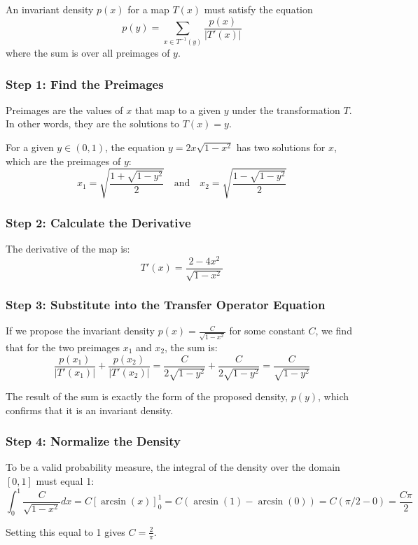 \documentclass[12pt,a4paper]{article}
\begin{document}
An invariant density $p(x)$ for a map $T(x)$ must satisfy the equation 
\[
p(y) = \sum_{x \in T^{-1}(y)} \frac{p(x)}{|T'(x)|}
\]
where the sum is over all preimages of $y$.

\subsubsection{Step 1: Find the Preimages}

Preimages are the values of $x$ that map to a given $y$ under the transformation $T$. In other words, they are the solutions to $T(x) = y$.

For a given $y \in (0, 1)$, the equation $y = 2x\sqrt{1-x^2}$ has two solutions for $x$, which are the preimages of $y$:
\[
x_1 = \sqrt{\frac{1+\sqrt{1-y^2}}{2}} \quad \text{and} \quad x_2 = \sqrt{\frac{1-\sqrt{1-y^2}}{2}}
\]

\subsubsection{Step 2: Calculate the Derivative}

The derivative of the map is:
\[
T'(x) = \frac{2-4x^2}{\sqrt{1-x^2}}
\]

\subsubsection{Step 3: Substitute into the Transfer Operator Equation}

If we propose the invariant density $p(x) = \frac{C}{\sqrt{1-x^2}}$ for some constant $C$, we find that for the two preimages $x_1$ and $x_2$, the sum is:
\[
\frac{p(x_1)}{|T'(x_1)|} + \frac{p(x_2)}{|T'(x_2)|} = \frac{C}{2\sqrt{1-y^2}} + \frac{C}{2\sqrt{1-y^2}} = \frac{C}{\sqrt{1-y^2}}
\]

The result of the sum is exactly the form of the proposed density, $p(y)$, which confirms that it is an invariant density.

\subsubsection{Step 4: Normalize the Density}

To be a valid probability measure, the integral of the density over the domain $[0, 1]$ must equal 1:
\[
\int_0^1 \frac{C}{\sqrt{1-x^2}}dx = C[\arcsin(x)]_0^1 = C(\arcsin(1)-\arcsin(0)) = C(\pi/2 - 0) = \frac{C\pi}{2}
\]

Setting this equal to 1 gives $C = \frac{2}{\pi}$.
\end{document}
